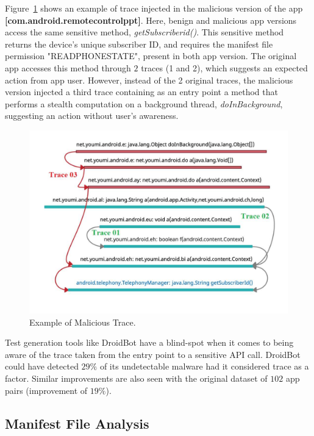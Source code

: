 Figure~\ref{fig:maliciousTrace} shows an example of trace injected in the malicious version of the app \textbf{[com.android.remotecontrolppt]}. Here, benign and malicious app versions access the same sensitive method, \textit{getSubscriberid()}. This sensitive method returns the device's unique subscriber ID, and requires the manifest file permission "READ\underline{\space}PHONE\underline{\space}STATE", present in both app version. The original app accesses this method through $2$ traces (1 and 2), which suggests an expected action from app user. However, instead of the 2 original traces, the malicious version injected a third trace containing as an entry point a method that performs a stealth computation on a background thread, \textit{doInBackground}, suggesting an action without user's awareness.

\begin{figure}
\centering
\includegraphics[scale=0.28]{images/maliciousTrace_example01.pdf}
\caption{Example of Malicious Trace.}
 \label{fig:maliciousTrace}
\end{figure}

\begin{obs}{2}{}
 Test generation tools like DroidBot have a blind-spot when it comes to being aware of the trace taken from the entry point to a sensitive API call. DroidBot could have detected $29\%$ of its undetectable malware had it considered trace as a factor. Similar  improvements are also seen with the original dataset of $102$ app pairs (improvement of $19\%$). 
 \end{obs}

\subsection{Manifest File Analysis}\label{sec:manifestResults}

